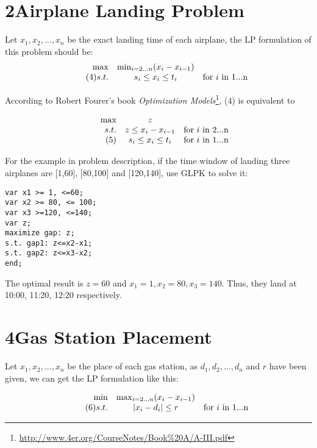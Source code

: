 \documentclass[a4paper,12pt]{article}
\begin{document}
\section*{2\quad Airplane Landing Problem}
Let $x_1,x_2,...,x_n$ be the exact landing time of each airplane, the LP formulation of this problem should be:
\[
\begin{array}{rcl}
\max & \min_{i=2...n} (x_i-x_{i-1}) &   \\ \tag{4}
s.t. & s_i \leq x_i \leq t_i & $for $i$ in 1...n$\\
\end{array} \nonumber
\]

According to Robert Fourer's book \emph{Optimization Models}\footnote{\url{http://www.4er.org/CourseNotes/Book\%20A/A-III.pdf}}, (4) is equivalent to

\[
\begin{array}{rcl}
\max & z\\
s.t. & z \leq x_i-x_{i-1} &   $for $i$ in 2...n$\\ \tag{5}
     & s_i \leq x_i \leq t_i & $for $i$ in 1...n$\\
\end{array} \nonumber
\]

For the example in problem description, if the time window of landing three airplanes are [1,60], [80,100] and [120,140], use GLPK to solve it:

\begin{lstlisting}
var x1 >= 1, <=60;
var x2 >= 80, <= 100;
var x3 >=120, <=140;
var z;
maximize gap: z;
s.t. gap1: z<=x2-x1;
s.t. gap2: z<=x3-x2;
end;
\end{lstlisting}

The optimal result is $z=60$ and $x_1=1, x_2=80, x_3=140$. Thus, they land at 10:00, 11:20, 12:20 respectively.

\section*{4\quad Gas Station Placement}

Let $x_1,x_2,...,x_n$ be the place of each gas station, as $d_1,d_2,...,d_n$ and $r$ have been given, we can get the LP formulation like this:

\[
\begin{array}{rcl}
\min & \max_{i=2...n} (x_i-x_{i-1}) &   \\ \tag{6}
s.t. & |x_i-d_i|\leq r & $for $i$ in 1...n$\\
\end{array} \nonumber
\]
\end{document}
